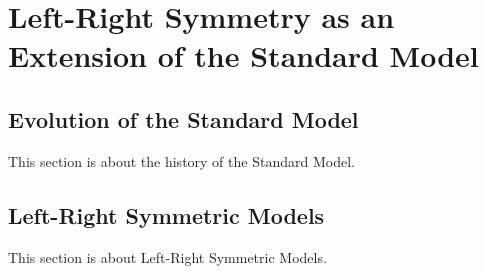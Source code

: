 \chapter{Left-Right Symmetry as an Extension of the Standard Model}
\label{lrsm_theory_chapter}

\section{Evolution of the Standard Model}
\label{sm_history}

This section is about the history of the Standard Model.

\section{Left-Right Symmetric Models}
\label{lrsmy}

This section is about Left-Right Symmetric Models.
